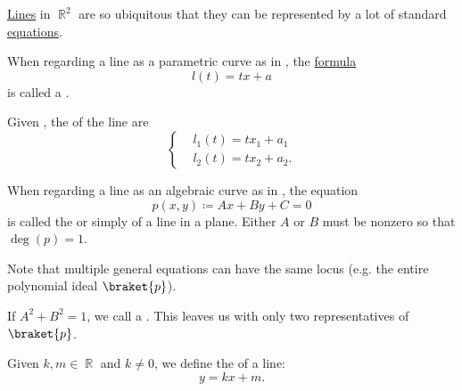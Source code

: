 \begin{definition}\label{def:plane_line_equations}
  \hyperref[def:geometric_line]{Lines} in \( \BbbR^2 \) are so ubiquitous that they can be represented by a lot of standard \hyperref[ex:equations]{equations}.

  \begin{thmenum}
     When regarding a line as a parametric curve as in , the \hyperref[def:first_order_syntax/formula]{formula}
    \begin{equation}\label{def:plane_line_equations/parametric_equation}
      l(t) = tx + a
    \end{equation}
    is called a .

     Given , the  of the line are
    \begin{equation}\label{def:plane_line_equations/scalar_parametric_equations}
      \begin{cases}
         & l_1(t) = t x_1 + a_1  \\
         & l_2(t) = t x_2 + a_2.
      \end{cases}
    \end{equation}

     When regarding a line as an algebraic curve as in , the equation
    \begin{equation}\label{def:plane_line_equations/general_equation}
      p(x, y) \coloneqq Ax + By + C = 0
    \end{equation}
    is called the  or simply  of a line in a plane. Either \( A \) or \( B \) must be nonzero so that \( \deg(p) = 1 \).

    Note that multiple general equations can have the same locus (e.g. the entire polynomial ideal \( \braket{p} \)).

     If \( A^2 + B^2 = 1 \), we call  a . This leaves us with only two representatives of \( \braket{p} \).

     Given \( k, m \in \BbbR \) and  \( k \neq 0 \), we define the  of a line:
    \begin{equation}\label{def:plane_line_equations/cartesian_equation}
      y = kx + m.
    \end{equation}


\end{thmenum}
\end{definition}
